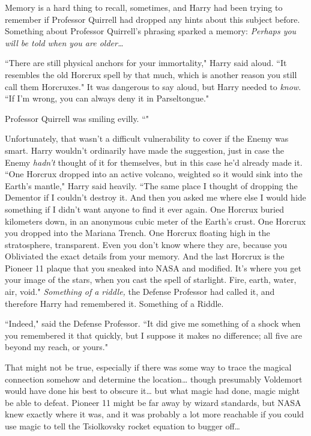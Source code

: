 Memory is a hard thing to recall, sometimes, and Harry had been trying to remember if Professor Quirrell had dropped any hints about this subject before. Something about Professor Quirrell's phrasing sparked a memory: \emph{Perhaps you will be told when you are older{\ldots}}

``There are still physical anchors for your immortality," Harry said aloud. ``It resembles the old Horcrux spell by that much, which is another reason you still call them Horcruxes." It was dangerous to say aloud, but Harry needed to \emph{know}. ``If I'm wrong, you can always deny it in Parseltongue."

Professor Quirrell was smiling evilly. ``"

Unfortunately, that wasn't a difficult vulnerability to cover if the Enemy was smart. Harry wouldn't ordinarily have made the suggestion, just in case the Enemy \emph{hadn't} thought of it for themselves, but in this case he'd already made it. ``One Horcrux dropped into an active volcano, weighted so it would sink into the Earth's mantle," Harry said heavily. ``The same place I thought of dropping the Dementor if I couldn't destroy it. And then you asked me where else I would hide something if I didn't want anyone to find it ever again. One Horcrux buried kilometers down, in an anonymous cubic meter of the Earth's crust. One Horcrux you dropped into the Mariana Trench. One Horcrux floating high in the stratosphere, transparent. Even you don't know where they are, because you Obliviated the exact details from your memory. And the last Horcrux is the Pioneer 11 plaque that you sneaked into NASA and modified. It's where you get your image of the stars, when you cast the spell of starlight. Fire, earth, water, air, void." \emph{Something of a riddle,} the Defense Professor had called it, and therefore Harry had remembered it. Something of a Riddle.

``Indeed," said the Defense Professor. ``It did give me something of a shock when you remembered it that quickly, but I suppose it makes no difference; all five are beyond my reach, or yours."

That might not be true, especially if there was some way to trace the magical connection somehow and determine the location{\ldots} though presumably Voldemort would have done his best to obscure it{\ldots} but what magic had done, magic might be able to defeat. Pioneer 11 might be far away by wizard standards, but NASA knew exactly where it was, and it was probably a lot more reachable if you could use magic to tell the Tsiolkovsky rocket equation to bugger off{\ldots}

